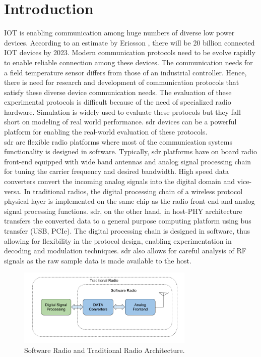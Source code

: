 \chapter{Introduction}
\ac{IOT} is enabling communication among huge numbers of diverse low power devices.  
According to an estimate by Ericsson \cite{noauthor_internet_2017}, there will be 20 billion connected \ac{IOT} devices by 2023.
Modern communication protocols need to be evolve rapidly to enable reliable connection among these devices.
The communication needs for a field temperature sensor differs from those of an industrial controller. 
Hence, there is need for research and development of communication protocols that satisfy these diverse device communication needs. 
The evaluation of these experimental protocols is difficult because of the need of specialized radio hardware.
Simulation is widely used to evaluate these protocols but they fall short on modeling of real world performance.
\ac{sdr} devices can be a powerful platform for enabling the real-world evaluation of these protocols.\\

\ac{sdr} are flexible radio platforms where most of the communication systems functionality is designed in software. Typically, \ac{sdr} platforms have on board radio front-end equipped with wide band antennas and analog signal processing chain for tuning the carrier frequency and desired bandwidth. High speed data converters convert the incoming analog signals into the digital domain and vice-versa. In traditional radios, the digital processing chain of a wireless protocol physical layer is implemented on the same chip as the radio front-end and analog signal processing functions. \ac{sdr}, on the other hand, in host-PHY \cite{nychis_enabling_nodate} architecture transfers the converted data to a general purpose computing platform using bus transfer (USB, PCIe).  The digital processing chain is designed in software, thus allowing for flexibility in the protocol design, enabling experimentation in decoding and modulation techniques. \ac{sdr} also allows for careful analysis of RF signals as the raw sample data is made available to the host.\\

\begin{figure}[!h]
\centering
\includegraphics[width=0.75\textwidth]{Figure/SDRSystem.png}
\caption{Software Radio and Traditional Radio Architecture.}
\label{sdr_architecture}
\end{figure}


